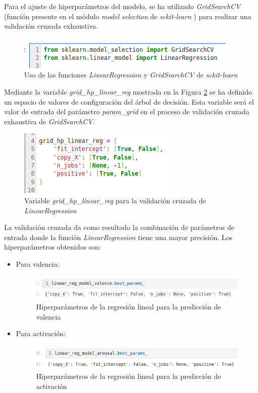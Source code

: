 \documentclass[12pt,a4paper]{article}
\begin{document}
Para el ajuste de hiperparámetros del modelo, se ha utilizado \textit{GridSearchCV} (función presente en el módulo \textit{model selection} de \textit{sckit-learn} \cite{scikit-learn}) para realizar una validación cruzada exhaustiva.
\begin{figure}[H]
	\centering
	\includegraphics[width=0.7\linewidth]{figs/import_linear_reg}
	\caption{Uso de las funciones \textit{LinearRegression} y \textit{GridSearchCV} de \textit{sckit-learn}}
	\label{fig:importlinearreg}
\end{figure}
Mediante la variable \textit{grid\_hp\_linear\_reg} mostrada en la Figura \ref{fig:paramslinearreg} se ha definido un espacio de valores de configuración del árbol de decisión. Esta variable será el valor de entrada del parámetro \textit{param\_grid} en el proceso de validación cruzada exhaustiva de \textit{GridSearchCV}.
\begin{figure}[H]
	\centering
	\includegraphics[width=0.7\linewidth]{figs/params_linear_reg}
	\caption{Variable \textit{grid\_hp\_linear\_reg} para la validación cruzada de \textit{LinearRegression}}
	\label{fig:paramslinearreg}
\end{figure}
La validación cruzada da como resultado la combinación de parámetros de entrada donde la función \textit{LinearRegression} tiene una mayor precisión. Los hiperparámetros obtenidos son:
\begin{itemize}
	\item Para valencia:
	\begin{figure}[H]
		\centering
		\includegraphics[width=0.7\linewidth]{figs/final_params_linear_valence}
		\caption{Hiperparámetros de la regresión lineal para la predicción de valencia}
		\label{fig:finalparamslinearvalence}
	\end{figure}
	\item Para activación:
	\begin{figure}[H]
		\centering
		\includegraphics[width=0.7\linewidth]{figs/final_params_linear_arousal}
		\caption{Hiperparámetros de la regresión lineal para la predicción de activación}
		\label{fig:finalparamslineararousal}
	\end{figure}
\end{itemize}
\end{document}
